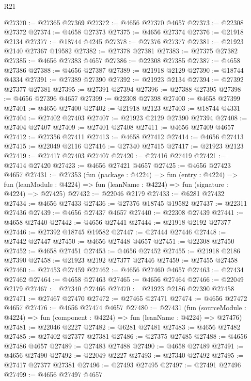 \begin{lexlean}{R21}
\begin{coremodule}
@27370 := @27365 @27369
@27372 := @4656 @27370 @4657
@27373 := @22308 @27372
@27374 := @4658 @27373
@27375 := @4656 @27374
@27376 := @21918 @2134
@27377 := @18744 @4245
@27378 := @27376 @27377
@27381 := @21923 @2140 @27367 @19582
@27382 := @27378 @27381
@27383 := @27375 @27382
@27385 := @4656 @27383 @4657
@27386 := @22308 @27385
@27387 := @4658 @27386
@27388 := @4656 @27387
@27389 := @21918 @2129
@27390 := @18744 @4334
@27391 := @27389 @27390
@27392 := @21923 @2134
@27394 := @27392 @27377 @27381
@27395 := @27391 @27394
@27396 := @27388 @27395
@27398 := @4656 @27396 @4657
@27399 := @22308 @27398
@27400 := @4658 @27399
@27401 := @4656 @27400
@27402 := @21918 @2123
@27403 := @18744 @4331
@27404 := @27402 @27403
@27407 := @21923 @2129 @27390 @27394
@27408 := @27404 @27407
@27409 := @27401 @27408
@27411 := @4656 @27409 @4657
@27412 := @27356 @27411
@27413 := @4658 @27412
@27414 := @4656 @27413
@27415 := @22049 @2116
@27416 := @27340 @27415
@27417 := @21923 @2123
@27419 := @27417 @27403 @27407
@27420 := @27416 @27419
@27421 := @27414 @27420
@27423 := @4656 @27421 @4657
@27425 := @4656 @27423 @4657
@27431 := @27353
    (fun (package : @4224) =>
    fun (entry : @4224) =>
    fun (leanModule : @4224) => fun (leanName : @4224) => fun (signature : @4224) => @27425)
@27432 := @22046 @2179
@27433 := @6281 @27432
@27434 := @4656 @27433
@27436 := @27376 @18745 @19582
@27437 := @22311 @27436
@27439 := @4656 @27437 @4657
@27440 := @22308 @27439
@27441 := @4658 @27440
@27442 := @4656 @27441
@27444 := @21918 @2192 @27377
@27446 := @27392 @18745 @19582
@27447 := @27444 @27446
@27448 := @27442 @27447
@27450 := @4656 @27448 @4657
@27451 := @22308 @27450
@27452 := @4658 @27451
@27453 := @4656 @27452
@27455 := @21918 @2186 @27390
@27458 := @21923 @2192 @27377 @27446
@27459 := @27455 @27458
@27460 := @27453 @27459
@27462 := @4656 @27460 @4657
@27463 := @27434 @27462
@27464 := @4658 @27463
@27465 := @4656 @27464
@27466 := @22049 @2179
@27467 := @27340 @27466
@27470 := @21923 @2186 @27390 @27458
@27471 := @27467 @27470
@27472 := @27465 @27471
@27474 := @4656 @27472 @4657
@27476 := @4656 @27474 @4657
@27480 := @27431
    (fun (sourceModule : @4224) => fun (component : @4224) => fun (leanName : @4224) => @27476)
@27481 := @22046 @2227
@27482 := @6281 @27481
@27483 := @4656 @27482
@27485 := @27402 @27377 @27381
@27486 := @27375 @27485
@27488 := @4656 @27486 @4657
@27489 := @27483 @27488
@27490 := @4658 @27489
@27491 := @4656 @27490
@27492 := @22049 @2227
@27493 := @27340 @27492
@27495 := @27417 @27377 @27381
@27496 := @27493 @27495
@27497 := @27491 @27496
@27499 := @4656 @27497 @4657

\end{coremodule}
\end{lexlean}
